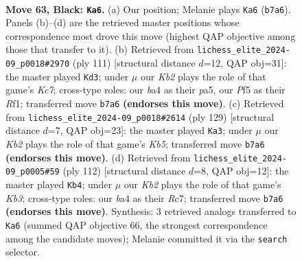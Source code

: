\documentclass[11pt]{article}
\begin{document}
\clearpage

\begin{figure}[p]\centering
\begin{subfigure}{0.46\textwidth}\centering
\resizebox{\linewidth}{!}{%
\newchessgame
\chessboard[
  setfen={8/1kp3R1/8/5p2/B4P2/4K3/7P/8 b - - 0 63},
  showmover=false,
  pgfstyle=straightmove, color=movearrow, markmove={b7-a6}
]}
\caption{}
\end{subfigure}\hfill
\begin{subfigure}{0.46\textwidth}\centering
\resizebox{\linewidth}{!}{%
\newchessgame
\chessboard[
  setfen={8/KP6/8/P7/8/8/2k1p2R/5r2 b - - 6 56},
  showmover=false,
  pgfstyle=straightmove, color=movearrow, markmove={c2-d3}
]}
\caption{}
\end{subfigure}
\\[4pt]
\begin{subfigure}{0.46\textwidth}\centering
\resizebox{\linewidth}{!}{%
\newchessgame
\chessboard[
  setfen={8/1R6/3PB3/1p2K2p/1k5P/8/8/8 b - - 1 65},
  showmover=false,
  pgfstyle=straightmove, color=movearrow, markmove={b4-a3}
]}
\caption{}
\end{subfigure}\hfill
\begin{subfigure}{0.46\textwidth}\centering
\resizebox{\linewidth}{!}{%
\newchessgame
\chessboard[
  setfen={1r6/1PR5/8/4pk2/7p/1K3P2/8/8 w - - 0 57},
  showmover=false,
  pgfstyle=straightmove, color=movearrow, markmove={b3-b4}
]}
\caption{}
\end{subfigure}
\caption{\textbf{Move 63, Black: \texttt{Ka6}.} (a) Our position; Melanie plays \texttt{Ka6} (\texttt{b7a6}). Panels (b)--(d) are the retrieved master positions whose correspondence most drove this move (highest QAP objective among those that transfer to it). (b) Retrieved from \texttt{lichess\_elite\_2024-09\_p0018\#2970} (ply 111) [structural distance $d$=12, QAP obj=31]: the master played \texttt{Kd3}; under $\mu$ our \emph{Kb2} plays the role of that game's \emph{Kc7}; cross-type roles: our \emph{b}a4 as their \emph{p}a5, our \emph{P}f5 as their \emph{R}f1; transferred move \texttt{b7a6} \textbf{(endorses this move)}. (c) Retrieved from \texttt{lichess\_elite\_2024-09\_p0018\#2614} (ply 129) [structural distance $d$=7, QAP obj=23]: the master played \texttt{Ka3}; under $\mu$ our \emph{Kb2} plays the role of that game's \emph{Kb5}; transferred move \texttt{b7a6} \textbf{(endorses this move)}. (d) Retrieved from \texttt{lichess\_elite\_2024-09\_p0005\#59} (ply 112) [structural distance $d$=8, QAP obj=12]: the master played \texttt{Kb4}; under $\mu$ our \emph{Kb2} plays the role of that game's \emph{Kb3}; cross-type roles: our \emph{b}a4 as their \emph{R}c7; transferred move \texttt{b7a6} \textbf{(endorses this move)}. Synthesis: 3 retrieved analogs transferred to \texttt{Ka6} (summed QAP objective 66, the strongest correspondence among the candidate moves); Melanie committed it via the \texttt{search} selector.}
\label{fig:thought-m125}
\end{figure}
\end{document}
